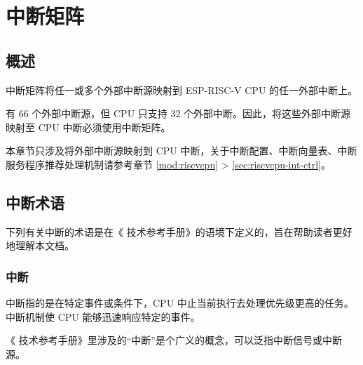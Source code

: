 \documentclass[main\_\_CN.tex]{subfiles}
\begin{document}

\ifglobal
\else
    \listoftodos
    {\let\clearpage\relax \listofdonetodos}
    \tableofcontents
\fi




\hypertarget{intmtrx}{}
\chapter{中断矩阵}
\label{mod:intmtrx}

\section{概述}

\chipname{} 中断矩阵将任一或多个外部中断源映射到 ESP-RISC-V CPU 的任一外部中断上。

\chipname{} 有 66 个外部中断源，但 CPU 只支持 32 个外部中断。因此，将这些外部中断源映射至 CPU 中断必须使用中断矩阵。

\begin{tiplisting}
本章节只涉及将外部中断源映射到 CPU 中断，关于中断配置、中断向量表、中断服务程序推荐处理机制请参考章节 \ref{mod:riscvcpu} \textit{} >  \ref{sec:riscvcpu-int-ctrl}\textit{}。
\end{tiplisting}
\vspace{-1em}

\section{\chipname{} 中断术语}\label{sec:intmtx-int-terminology}

下列有关中断的术语是在《\chipname{} 技术参考手册》的语境下定义的，旨在帮助读者更好地理解本文档。

\subsection{中断}

中断指的是在特定事件或条件下，CPU 中止当前执行去处理优先级更高的任务。中断机制使 CPU 能够迅速响应特定的事件。

《\chipname{} 技术参考手册》里涉及的“中断”是个广义的概念，可以泛指中断信号或中断源。
\end{document}
